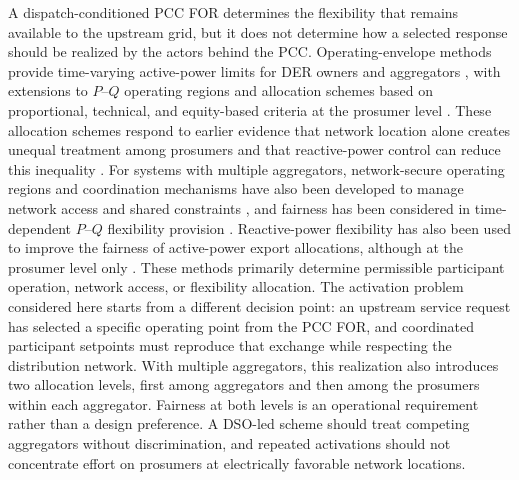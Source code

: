 \documentclass[journal]{IEEEtran}
\begin{document}
A dispatch-conditioned PCC FOR determines the flexibility that remains available to the upstream grid, but it does not determine how a selected response should be realized by the actors behind the PCC. Operating-envelope methods provide time-varying active-power limits for DER owners and aggregators \cite{petrou2021,liu2022}, with extensions to $P$--$Q$ operating regions \cite{zabihinia2022pqdoe,lankeshwara2024operatingregions} and allocation schemes based on proportional, technical, and equity-based criteria at the prosumer level \cite{petrou2020weighted,alam2023,gao2025equitablepq}. These allocation schemes respond to earlier evidence that network location alone creates unequal treatment among prosumers \cite{tonkoski2011curtailment,lusis2020fairness} and that reactive-power control can reduce this inequality \cite{gebbran2021voltvar}. For systems with multiple aggregators, network-secure operating regions and coordination mechanisms have also been developed to manage network access and shared constraints \cite{russell2024networksecure,chen2024dera,jiang2025bargaining}, and fairness has been considered in time-dependent $P$--$Q$ flexibility provision \cite{kryonidis2025fair}. Reactive-power flexibility has also been used to improve the fairness of active-power export allocations, although at the prosumer level only \cite{lukac2026reactivefair}. These methods primarily determine permissible participant operation, network access, or flexibility allocation. The activation problem considered here starts from a different decision point: an upstream service request has selected a specific operating point from the PCC FOR, and coordinated participant setpoints must reproduce that exchange while respecting the distribution network. With multiple aggregators, this realization also introduces two allocation levels, first among aggregators and then among the prosumers within each aggregator. Fairness at both levels is an operational requirement rather than a design preference. A DSO-led scheme should treat competing aggregators without discrimination, and repeated activations should not concentrate effort on prosumers at electrically favorable network locations.
\end{document}
